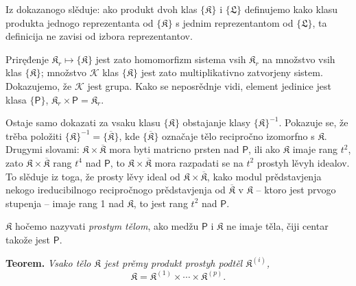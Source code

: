 \documentclass[11pt]{article}
\begin{document}
Iz dokazanogo slěduje: ako produkt dvoh klas \(\{\mathfrak K\}\) i \(\{\mathfrak L\}\) definujemo kako klasu produkta jednogo reprezentanta od \(\{\mathfrak K\}\) s jednim reprezentantom od \(\{\mathfrak L\}\), ta definicija ne zavisi od izbora reprezentantov.

Priręđenje \(\mathfrak K_r\mapsto\{\mathfrak K\}\) jest zato homomorfizm sistema vsih \(\mathfrak K_r\) na množstvo vsih klas \(\{\mathfrak K\}\); množstvo \(\mathscr K\) klas \(\{\mathfrak K\}\) jest zato multiplikativno zatvorjeny sistem. Dokazujemo, že \(\mathscr K\) jest grupa. Kako se neposrědnje vidi, element jedinice jest klasa \(\{\mathsf P\}\), \(\mathfrak K_r\times\mathsf P=\mathfrak K_r\).

Ostaje samo dokazati za vsaku klasu \(\{\mathfrak K\}\) obstajanje klasy \(\{\mathfrak K\}^{-1}\). Pokazuje se, že trěba položiti \(\{\mathfrak K\}^{-1}=\{\overline{\mathfrak K}\}\), kde \(\{\overline{\mathfrak K}\}\) označaje tělo recipročno izomorfno s \(\mathfrak K\). Drugymi slovami: \(\mathfrak K\times\overline{\mathfrak K}\) mora byti matricno prsten nad \(\mathsf P\), ili ako \(\mathfrak K\) imaje rang \(t^2\), zato \(\mathfrak K\times\overline{\mathfrak K}\) rang \(t^4\) nad \(\mathsf P\), to \(\mathfrak K\times\overline{\mathfrak K}\) mora razpadati se na \(t^2\) prostyh lěvyh idealov. To slěduje iz toga, že prosty lěvy ideal od \(\mathfrak K\times\overline{\mathfrak K}\), kako modul prědstavjenja nekogo ireducibilnogo recipročnogo prědstavjenja od \(\overline{\mathfrak K}\) v \(\mathfrak K\) -- ktoro jest prvogo stupenja -- imaje rang 1 nad \(\mathfrak K\), to jest rang \(t^2\) nad \(\mathsf P\).

\(\mathfrak K\) hočemo nazyvati \emph{prostym tělom}, ako medžu \(\mathsf P\) i \(\mathfrak K\) ne imaje těla, čiji centar takože jest \(\mathsf P\).

\textbf{Teorem.} \emph{Vsako tělo \(\mathfrak K\) jest prěmy produkt prostyh podtěl \(\mathfrak K^{(i)}\),}
\[
\mathfrak K=\mathfrak K^{(1)}\times\cdots\times\mathfrak K^{(p)}.
\]
\end{document}
